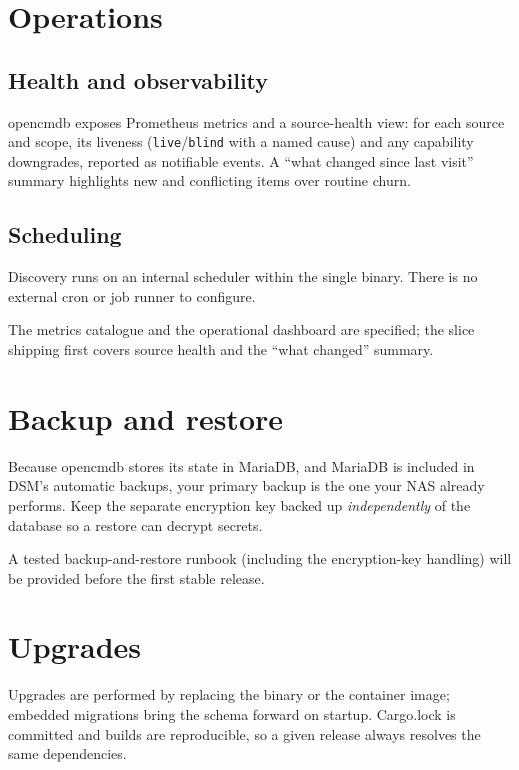 \documentclass[11pt,oneside,listof=totoc,bibliography=totoc]{scrreprt}
\begin{document}
\chapter{Operations}
\section{Health and observability}
opencmdb exposes Prometheus metrics and a source-health view: for each source and scope, its
liveness (\texttt{live}/\texttt{blind} with a named cause) and any capability downgrades,
reported as notifiable events. A ``what changed since last visit'' summary highlights new and
conflicting items over routine churn.

\section{Scheduling}
Discovery runs on an internal scheduler within the single binary. There is no external cron
or job runner to configure.

\begin{planned}
The metrics catalogue and the operational dashboard are specified; the slice shipping first
covers source health and the ``what changed'' summary.
\end{planned}

\chapter{Backup and restore}
Because opencmdb stores its state in MariaDB, and MariaDB is included in DSM's automatic
backups, your primary backup is the one your NAS already performs. Keep the separate
encryption key backed up \emph{independently} of the database so a restore can decrypt
secrets.

\begin{planned}
A tested backup-and-restore runbook (including the encryption-key handling) will be provided
before the first stable release.
\end{planned}

\chapter{Upgrades}
Upgrades are performed by replacing the binary or the container image; embedded migrations
bring the schema forward on startup. Cargo.lock is committed and builds are reproducible, so
a given release always resolves the same dependencies.
\end{document}
